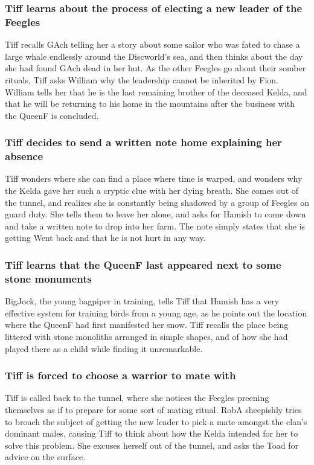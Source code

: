 \subsubsection{\Gls{Tiff} learns about the process of electing a new leader of the Feegles}
\Gls{Tiff} recalls \Gls{GAch} telling her a story about some sailor who was fated to chase a large
whale endlessly around the Discworld's sea, and then thinks about the day she had found \Gls{GAch}
dead in her hut. As the other Feegles go about their somber rituals, \Gls{Tiff} asks \Gls{William}
why the leadership cannot be inherited by \Gls{Fion}. \Gls{William} tells her that he is the last
remaining brother of the deceased \Gls{Kelda}, and that he will be returning to his home in the
mountains after the business with the \Gls{QueenF} is concluded.

\subsubsection{\Gls{Tiff} decides to send a written note home explaining her absence}
\Gls{Tiff} wonders where she can find a place where time is warped, and wonders why the \Gls{Kelda}
gave her such a cryptic clue with her dying breath. She comes out of the tunnel, and realizes she
is constantly being shadowed by a group of Feegles on guard duty. She tells them to leave her alone,
and asks for \Gls{Hamish} to come down and take a written note to drop into her farm. The note
simply states that she is getting \Gls{Went} back and that he is not hurt in any way.

\subsubsection{\Gls{Tiff} learns that the \Gls{QueenF} last appeared next to some stone monuments}
\Gls{BigJock}, the young bagpiper in training, tells \Gls{Tiff} that \Gls{Hamish} has a very
effective system for training birds from a young age, as he points out the location where the
\Gls{QueenF} had first manifested her snow. \Gls{Tiff} recalls the place being littered with stone
monoliths arranged in simple shapes, and of how she had played there as a child while finding it
unremarkable.

\subsubsection{\Gls{Tiff} is forced to choose a warrior to mate with}
\Gls{Tiff} is called back to the tunnel, where she notices the Feegles preening themselves as if
to prepare for some sort of mating ritual. \Gls{RobA} sheepishly tries to broach the subject of
getting the new leader to pick a mate amongst the clan's dominant males, causing \Gls{Tiff} to
think about how the \Gls{Kelda} intended for her to solve this problem. She excuses herself out of
the tunnel, and asks the \Gls{Toad} for advice on the surface.

